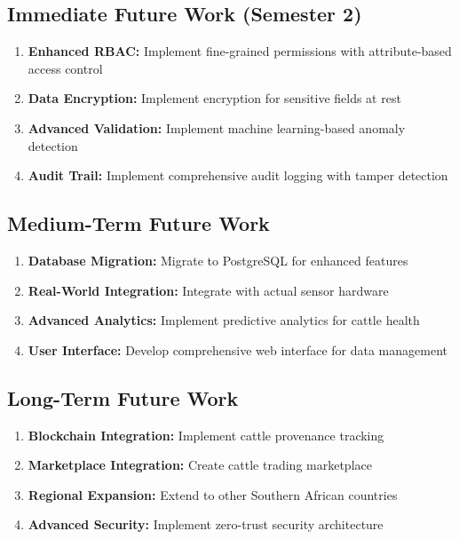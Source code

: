 \subsection{Immediate Future Work (Semester 2)}

\begin{enumerate}
    \item \textbf{Enhanced RBAC:} Implement fine-grained permissions with attribute-based access control
    \item \textbf{Data Encryption:} Implement encryption for sensitive fields at rest
    \item \textbf{Advanced Validation:} Implement machine learning-based anomaly detection
    \item \textbf{Audit Trail:} Implement comprehensive audit logging with tamper detection
\end{enumerate}

\subsection{Medium-Term Future Work}

\begin{enumerate}
    \item \textbf{Database Migration:} Migrate to PostgreSQL for enhanced features
    \item \textbf{Real-World Integration:} Integrate with actual sensor hardware
    \item \textbf{Advanced Analytics:} Implement predictive analytics for cattle health
    \item \textbf{User Interface:} Develop comprehensive web interface for data management
\end{enumerate}

\subsection{Long-Term Future Work}

\begin{enumerate}
    \item \textbf{Blockchain Integration:} Implement cattle provenance tracking
    \item \textbf{Marketplace Integration:} Create cattle trading marketplace
    \item \textbf{Regional Expansion:} Extend to other Southern African countries
    \item \textbf{Advanced Security:} Implement zero-trust security architecture
\end{enumerate}

